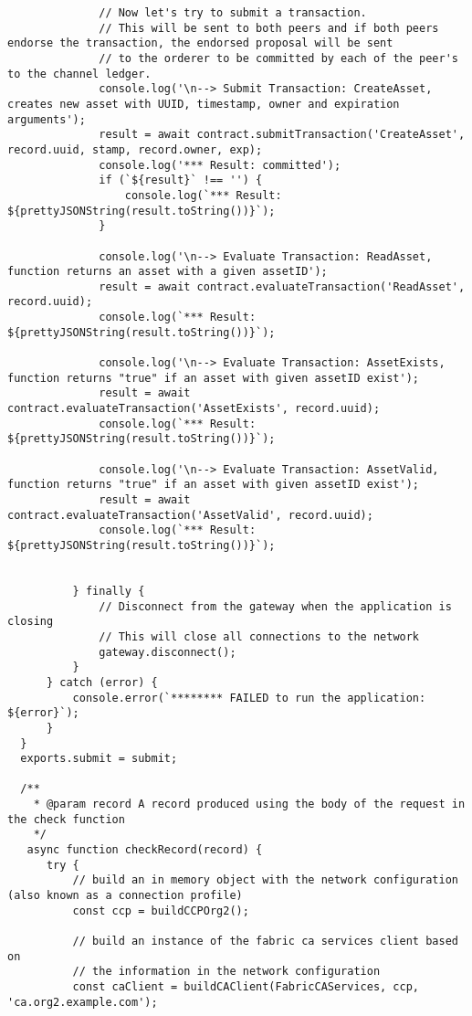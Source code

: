 \begin{lstlisting}
              // Now let's try to submit a transaction.
              // This will be sent to both peers and if both peers endorse the transaction, the endorsed proposal will be sent
              // to the orderer to be committed by each of the peer's to the channel ledger.
              console.log('\n--> Submit Transaction: CreateAsset, creates new asset with UUID, timestamp, owner and expiration arguments');
              result = await contract.submitTransaction('CreateAsset', record.uuid, stamp, record.owner, exp);
              console.log('*** Result: committed');
              if (`${result}` !== '') {
                  console.log(`*** Result: ${prettyJSONString(result.toString())}`);
              }
  
              console.log('\n--> Evaluate Transaction: ReadAsset, function returns an asset with a given assetID');
              result = await contract.evaluateTransaction('ReadAsset', record.uuid);
              console.log(`*** Result: ${prettyJSONString(result.toString())}`);
  
              console.log('\n--> Evaluate Transaction: AssetExists, function returns "true" if an asset with given assetID exist');
              result = await contract.evaluateTransaction('AssetExists', record.uuid);
              console.log(`*** Result: ${prettyJSONString(result.toString())}`);
  
              console.log('\n--> Evaluate Transaction: AssetValid, function returns "true" if an asset with given assetID exist');
              result = await contract.evaluateTransaction('AssetValid', record.uuid);
              console.log(`*** Result: ${prettyJSONString(result.toString())}`);
  
              
          } finally {
              // Disconnect from the gateway when the application is closing
              // This will close all connections to the network
              gateway.disconnect();
          }
      } catch (error) {
          console.error(`******** FAILED to run the application: ${error}`);
      }
  }
  exports.submit = submit;
  
  /**
    * @param record A record produced using the body of the request in the check function
    */
   async function checkRecord(record) {
      try {
          // build an in memory object with the network configuration (also known as a connection profile)
          const ccp = buildCCPOrg2();
  
          // build an instance of the fabric ca services client based on
          // the information in the network configuration
          const caClient = buildCAClient(FabricCAServices, ccp, 'ca.org2.example.com');
  

\end{lstlisting}

